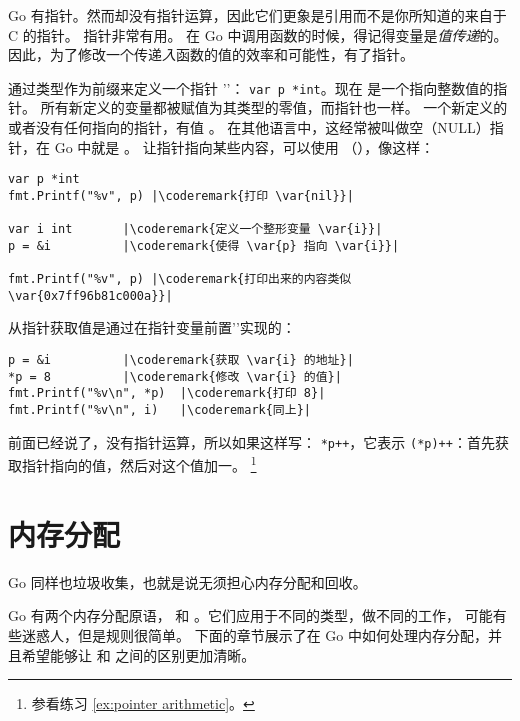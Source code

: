 \noindent{}
Go 有指针。然而却没有指针运算，因此它们更象是引用而不是你所知道的来自于 C 的指针。
指针非常有用。
在 Go 中调用函数的时候，得记得变量是\emph{值传递}的。
因此，为了修改一个传递\emph{入}函数的值的效率和可能性，有了指针。

通过类型作为前缀来定义一个指针 '\key{*}'：
\lstinline{var p *int}。现在  是一个指向整数值的指针。
所有新定义的变量都被赋值为其类型的零值，而指针也一样。
一个新定义的或者没有任何指向的指针，有值 。
在其他语言中，这经常被叫做空（NULL）指针，在 Go 中就是 。
让指针指向某些内容，可以使用
（\func{\&}），像这样：
\begin{lstlisting}[caption=Use of a pointer,label=src:pointers]
var p *int
fmt.Printf("%v", p) |\coderemark{打印 \var{nil}}|

var i int	    |\coderemark{定义一个整形变量 \var{i}}|
p = &i		    |\coderemark{使得 \var{p} 指向 \var{i}}|

fmt.Printf("%v", p) |\coderemark{打印出来的内容类似 \var{0x7ff96b81c000a}}|
\end{lstlisting}

从指针获取值是通过在指针变量前置'\type{*}'实现的：
\begin{lstlisting}[caption=获取指针指向的值,label=src:deref]
p = &i			|\coderemark{获取 \var{i} 的地址}|
*p = 8			|\coderemark{修改 \var{i} 的值}|
fmt.Printf("%v\n", *p)  |\coderemark{打印 8}|
fmt.Printf("%v\n", i)	|\coderemark{同上}|
\end{lstlisting}

\label{main:pointer arithmetic}
前面已经说了，没有指针运算，所以如果这样写：
\lstinline{*p++}，它表示 \lstinline{(*p)++}：首先获取指针指向的值，然后对这个值加一。
\footnote{参看练习 \ref{ex:pointer arithmetic}。}


\section{内存分配}
Go 同样也垃圾收集，也就是说无须担心内存分配和回收。

Go 有两个内存分配原语， 和 。它们应用于不同的类型，做不同的工作，
可能有些迷惑人，但是规则很简单。
下面的章节展示了在 Go 中如何处理内存分配，并且希望能够让
 和  之间的区别更加清晰。


